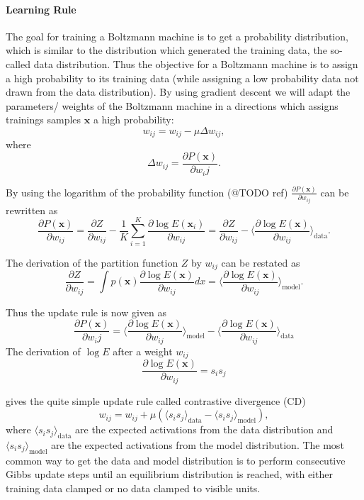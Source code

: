 \paragraph{Learning Rule}

The goal for training a Boltzmann machine is to get a probability distribution, which is similar to the distribution which generated the training data, the so-called data distribution.
Thus the objective for a Boltzmann machine is to assign a high probability to its training data (while assigning a low probability data not drawn from the data distribution).
By using gradient descent we will adapt the parameters/ weights of the Boltzmann machine in a directions which assigns trainings samples $\textbf{x}$ a high probability:
\[
w_{ij} = w_{ij} - \mu \Delta w_{ij},
\]
where
\[
\Delta w_{ij} = \frac{\partial P(\textbf{x})}{\partial w_ij}.
\]

By using the logarithm of the probability function (@TODO ref) $\frac{\partial P(\textbf{x})}{\partial w_{ij}}$ can be rewritten as
\[
\frac{\partial P(\textbf{x})}{\partial w_{ij}} = \frac{\partial Z}{\partial w_{ij}} - \frac{1}{K} \sum_{i=1}^K \frac{\partial \log E(\textbf{x}_i)}{\partial w_{ij}} =  \frac{\partial Z}{\partial w_{ij}} - \Big \langle \frac{\partial \log E(\textbf{x})}{\partial w_{ij}} \Big \rangle_{\text{data}}.
\]    

The derivation of the partition function $Z$ by $w_{ij}$ can be restated as
\[
 \frac{\partial Z}{\partial w_{ij}} = \int p(\textbf{x}) \frac{\partial \log E(\textbf{x})}{\partial w_{ij}} dx = \Big \langle \frac{\partial \log E(\textbf{x})}{\partial w_{ij}} \Big \rangle_{\text{model}}.
\]

Thus the update rule is now given as
\[
\frac{\partial P(\textbf{x})}{\partial w_ij} =  \Big \langle \frac{\partial \log E(\textbf{x})}{\partial w_{ij}} \Big \rangle_{\text{model}} - \Big \langle \frac{\partial \log E(\textbf{x})}{\partial w_{ij}} \Big \rangle_{\text{data}}
\]
The derivation of $\log E$ after a weight $w_{ij}$
\[
\frac{\partial \log E(\textbf{x})}{\partial w_{ij}} = s_i s_j
\]

gives the quite simple update rule called contrastive divergence (CD)
\[
w_{ij}= w_{ij} + \mu ( \langle s_i s_j \rangle_{\text{data}} - \langle s_i s_j \rangle_{\text{model}} ) ,
\]
where $\langle s_i s_j \rangle_{\text{data}}$ are the expected activations from the data distribution and  $ \langle s_i s_j \rangle_{\text{model}}$ are the expected activations from the model distribution.
The most common way to get the data and model distribution is to perform consecutive Gibbs update steps until an equilibrium distribution is reached, with either training data clamped or no data clamped to visible units.

